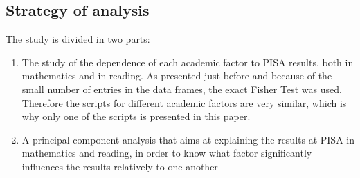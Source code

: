 \documentclass[12pt,a4paper]{article}
\begin{document}
\subsection{Strategy of analysis}

The study is divided in two parts:
\begin{enumerate}
	\item The study of the dependence of each academic factor to PISA results, both in mathematics and in reading. As presented just before and because of the small number of entries in the data frames, the exact Fisher Test was used. Therefore the scripts for different academic factors are very similar, which is why only one of the scripts is presented in this paper.
	\item A principal component analysis that aims at explaining the results at PISA in mathematics and reading, in order to know what factor significantly influences the results relatively to one another
\end{enumerate}
\end{document}
